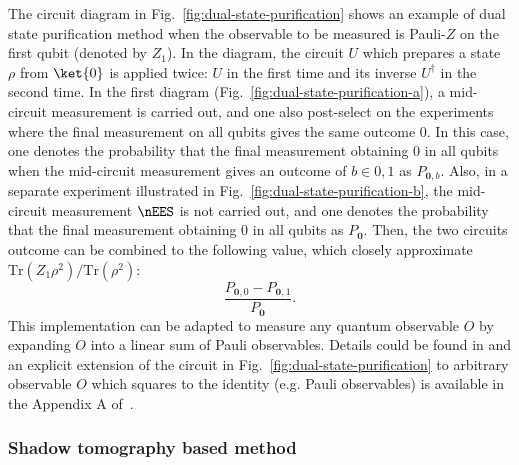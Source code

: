 The circuit diagram in Fig.~\ref{fig:dual-state-purification} shows an example of dual state purification method when the observable to be measured is Pauli-$Z$ on the first qubit (denoted by $Z_1$).
In the diagram, the circuit $U$ which prepares a state $\rho$ from $\ket{0}$ is applied twice:
$U$ in the first time and its inverse $U^\dagger$ in the second time.
In the first diagram (Fig.~\ref{fig:dual-state-purification-a}),
a mid-circuit measurement is carried out, and one also post-select on the experiments where the final measurement on all qubits gives the same outcome $0$. In this case, one denotes the probability that the final measurement obtaining $0$ in all qubits when the mid-circuit measurement gives an outcome of $b\in{0,1}$ as $P_{\mathbf{0}, b}$.
Also, in a separate experiment illustrated in Fig.~\ref{fig:dual-state-purification-b}, the mid-circuit measurement $\nEES$ is not carried out, and one
denotes the probability that the final measurement obtaining $0$ in all qubits as $P_{\mathbf{0}}$.
Then, the two circuits outcome can be combined to the following value, which closely approximate $\mathrm{Tr}(Z_1 \rho^2)/\mathrm{Tr}(\rho^2)$:
\begin{equation}
    \frac{P_{\mathbf{0}, 0} - P_{\mathbf{0}, 1}}{P_{\mathbf{0}}}.
\end{equation} 
This implementation can be adapted to measure any quantum observable $O$ by expanding $O$ into a linear sum of Pauli observables. Details could be found in \citet{huoDualstatePurificationPractical2021} 
and an explicit extension of the circuit in Fig.~\ref{fig:dual-state-purification} to arbitrary observable $O$ which squares to
the identity (e.g. Pauli observables) is available in the Appendix A of~\citet{cai2021resourceefficient}.

\subsubsection{Shadow tomography based method}
\label{sec:derangement-details_shadow-distillation}


